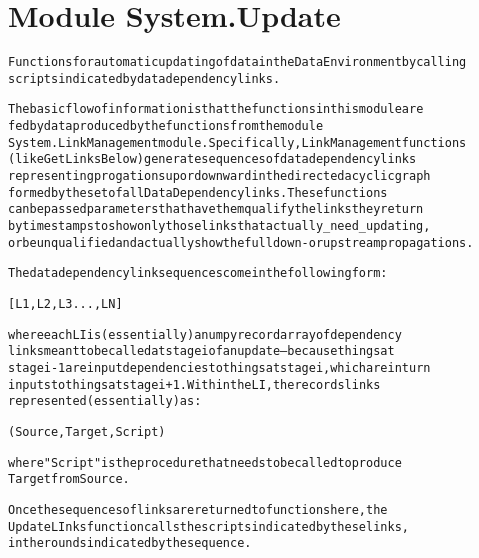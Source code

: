 %
%
%


\section{Module System.Update}

    \label{System:Update}
\begin{alltt}

Functions for automatic updating of data in the Data Environment by calling 
scripts indicated by data dependency links. 
        
The basic flow of information is that the functions in this module are 
fed by data produced by the functions from the module 
System.LinkManagement module.  Specifically, LinkManagement functions
(like GetLinksBelow) generate sequences of data dependency links 
representing progations up or downward in the directed acyclic graph
formed by the set of all Data Dependency links.  These functions 
can be passed parameters that have them qualify the links they return 
by timestamps to show only those links that actually \_need\_ updating, 
or be unqualified and actually show the full down- or upstream propagations. 

The data dependency link sequences come in the following form:

        [L1, L2, L3 ... , LN]

where each LI is (essentially) a numpy record array of dependency 
links meant to be called at stage i of an update -- because things at 
stage i-1 are input dependencies to things at stage i, which are in turn 
inputs to things at stage i + 1.   Within the LI, the records links 
represented (essentially) as:

        (Source,Target,Script)

where "Script" is the procedure that needs to be called to produce
Target from Source. 

Once the sequences of links are returned to functions here, the 
UpdateLInks function calls the scripts indicated by these links,
in the rounds indicated by the sequence. 


\end{alltt}
